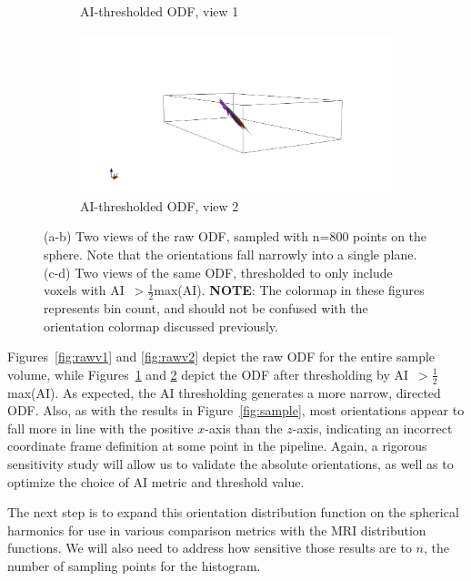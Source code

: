 \documentclass[11pt]{article}
\begin{document}
\begin{figure}[h]
\begin{subfigure}[b]{0.48\textwidth}
    \caption{AI-thresholded ODF, view 1\label{fig:maskedv1}}
  \end{subfigure}
  \hspace{1em}
  \begin{subfigure}[b]{0.48\textwidth}
    \centering \includegraphics[width=\textwidth]{../figs/ODF_masked_d2n7_view2}
    \caption{AI-thresholded ODF, view 2\label{fig:maskedv2}}
  \end{subfigure}
  \caption{(a-b) Two views of the raw ODF, sampled with n=800 points on the
    sphere. Note that the orientations fall narrowly into a single plane. (c-d)
    Two views of the same ODF, thresholded to only include voxels with
    AI~$> \frac{1}{2}$max(AI). \textbf{NOTE}: The colormap in these figures
    represents bin count, and should not be confused with the orientation
    colormap discussed previously.\label{fig:ODFs}}
\end{figure}
Figures~\ref{fig:rawv1} and \ref{fig:rawv2} depict the raw ODF for the entire
sample volume, while Figures~\ref{fig:maskedv1} and \ref{fig:maskedv2} depict
the ODF after thresholding by AI~$>\frac{1}{2}$max(AI). As expected, the AI
thresholding generates a more narrow, directed ODF. Also, as with the results in
Figure~\ref{fig:sample}, most orientations appear to fall more in line with the
positive $x$-axis than the $z$-axis, indicating an incorrect coordinate frame
definition at some point in the pipeline. Again, a rigorous sensitivity study
will allow us to validate the absolute orientations, as well as to optimize the
choice of AI metric and threshold value.

The next step is to expand this orientation distribution function on the
spherical harmonics for use in various comparison metrics with the MRI
distribution functions. We will also need to address how sensitive those results
are to $n$, the number of sampling points for the histogram.
\end{document}
